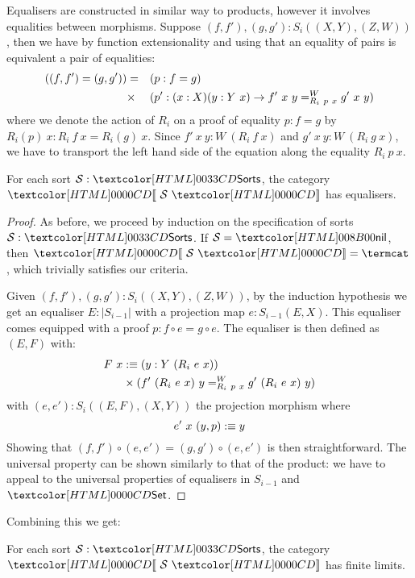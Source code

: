 Equalisers are constructed in similar way to products, however it
involves equalities between morphisms. Suppose
$(f,f'), (g,g') : S_i((X,Y),(Z,W))$, then we have by function
extensionality and using that an equality of pairs is equivalent a
pair of equalities:
% 
\begin{align*}
  ((f,f') = (g,g')) &=& &(p : f = g) \\
                    &\times& &(p' : (x : X) (y : Y\ x) \to \pathover{W}{R_i\ p\ x}{f'\ x\ y}{g'\ x\ y})
\end{align*}
% 
where we denote the action of $R_i$ on a proof of equality $p : f = g$
by $R_i(p)\ x : R_i\ f\ x = R_i(g)\ x$. Since
$f'\ x\ y : W\ (R_i\ f\ x)$ and $g'\ x\ y : W\ (R_i\ g\ x)$, we have
to transport the left hand side of the equation along the equality
$R_i\ p\ x$.

\begin{lemma}
\label{sorts-equalisers}
  For each sort $\Ss : \sortsty$, the category $\SortCat{\Ss}$ has
  equalisers.
\end{lemma}

\begin{proof}
  As before, we proceed by induction on the specification of sorts
  $\Ss : \sortsty$.  If $\Ss = \sortsnil$, then $\SortCat{\Ss} = \termcat$,
  which trivially satisfies our criteria.



  Given $(f,f'), (g,g') : S_i((X,Y),(Z,W))$, by the induction
  hypothesis we get an equaliser $E : |S_{i-1}|$ with a projection map
  $e : S_{i-1}(E,X)$. This equaliser comes equipped with a proof
  $p : f \circ e = g \circ e$. The equaliser is then defined as
  $(E,F)$ with:
  \begin{align*}
    F\ x & \ddefeq (y : Y\ (R_i\ e\ x)) \\
         & \times (\pathover{W}{R_i\ p\ x}{f'\ (R_i\ e\ x)\ y}{g'\ (R_i\ e\ x)\ y})
  \end{align*}
  with $(e,e') : S_i((E,F),(X,Y))$ the projection morphism where
  \[
    e'\ x\ (y , p) \ddefeq y
  \]
  Showing that $(f,f') \circ (e,e') = (g,g') \circ (e,e')$ is then
  straightforward. The universal property can be shown similarly to
  that of the product: we have to appeal to the universal properties
  of equalisers in $S_{i-1}$ and $\Set$.
\end{proof}

Combining this we get:

\begin{theorem}
  \label{limits-sorts}
  For each sort $\Ss : \sortsty$, the category $\SortCat{\Ss}$ has
  finite limits.
\end{theorem}

